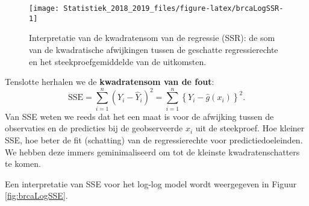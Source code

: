 \documentclass[12pt,dutch,coursenotes]{book}
\newenvironment{Shaded}{\begin{snugshade}}{\end{snugshade}}
\newcommand{\KeywordTok}[1]{\textcolor[rgb]{0.13,0.29,0.53}{\textbf{#1}}}
\newcommand{\DataTypeTok}[1]{\textcolor[rgb]{0.13,0.29,0.53}{#1}}
\newcommand{\DecValTok}[1]{\textcolor[rgb]{0.00,0.00,0.81}{#1}}
\newcommand{\FloatTok}[1]{\textcolor[rgb]{0.00,0.00,0.81}{#1}}
\newcommand{\StringTok}[1]{\textcolor[rgb]{0.31,0.60,0.02}{#1}}
\newcommand{\ControlFlowTok}[1]{\textcolor[rgb]{0.13,0.29,0.53}{\textbf{#1}}}
\newcommand{\OperatorTok}[1]{\textcolor[rgb]{0.81,0.36,0.00}{\textbf{#1}}}
\newcommand{\NormalTok}[1]{#1}
\theoremstyle{definition}
\theoremstyle{definition}
\theoremstyle{definition}
\theoremstyle{remark}
\begin{document}
\begin{figure}

{\centering \texttt{[image: Statistiek\_2018\_2019\_files/figure-latex/brcaLogSSR-1]} 

}

\caption{Interpretatie van de kwadratensom van de regressie (SSR): de som van de kwadratische afwijkingen tussen de geschatte regressierechte en het steekproefgemiddelde van de uitkomsten.}\label{fig:brcaLogSSR}
\end{figure}

Tenslotte herhalen we de \textbf{kwadratensom van de fout}:
\[ \text{SSE} = \sum_{i=1}^n (Y_i-\hat{Y}_i )^2 = \sum_{i=1}^n \left\{Y_i-\hat{g}\left(x_i\right)\right\}^2.\]
Van SSE weten we reeds dat het een maat is voor de afwijking tussen de
observaties en de predicties bij de geobserveerde \(x_i\) uit de
steekproef. Hoe kleiner SSE, hoe beter de fit (schatting) van de
regressierechte voor predictiedoeleinden. We hebben deze immers
geminimaliseerd om tot de kleinste kwadratenschatters te komen.

Een interpretatie van SSE voor het log-log model wordt weergegeven in
Figuur \ref{fig:brcaLogSSE}.

\begin{Shaded}
\end{Shaded}
\end{document}

